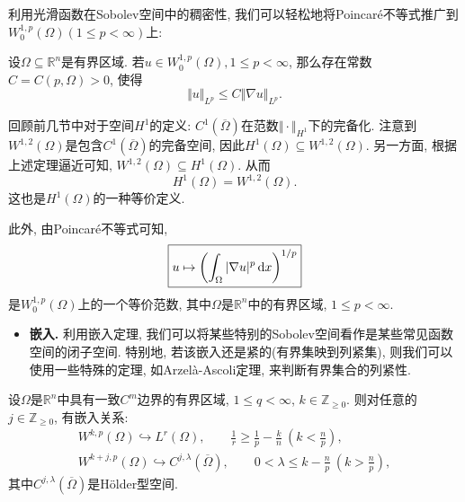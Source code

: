 利用光滑函数在Sobolev空间中的稠密性, 我们可以轻松地将Poincar\'e不等式推广到$W_0^{1, p}(\Omega) (1 \leq p < \infty)$上:

\begin{corollary}[Poincaré不等式]
    设$\Omega \subseteq \mathbb{R}^n$是有界区域. 若$u \in W_0^{1, p}(\Omega), 1 \leq p < \infty$, 那么存在常数$C = C(p, \Omega) > 0$, 使得 
    \begin{equation*}
        \Vert u \Vert_{L^p} \leq C\Vert \nabla u \Vert_{L^p}.
    \end{equation*}
\end{corollary}

回顾前几节中对于空间$H^1$的定义: $C^1(\overline{\Omega})$在范数$\Vert \cdot \Vert_{H^1}$下的完备化.
注意到$W^{1, 2}(\Omega)$是包含$C^1(\overline{\Omega})$的完备空间, 因此$H^1(\Omega) \subseteq W^{1, 2}(\Omega)$.
另一方面, 根据上述定理逼近可知, $W^{1, 2}(\Omega) \subseteq H^1(\Omega)$. 从而
\begin{equation*}
    \boxed{H^1(\Omega) = W^{1, 2}(\Omega).}
\end{equation*} 
这也是$H^1(\Omega)$的一种等价定义.

此外, 由Poincaré不等式可知, 
\begin{equation*}
    \boxed{u \mapsto \left(\int_{\Omega}|\nabla u|^p \,{\rm d}x\right)^{1/p}}
\end{equation*}
是$W_0^{1, p}(\Omega)$上的一个等价范数, 其中$\Omega$是$\mathbb{R}^n$中的有界区域, $1 \leq p < \infty$.

\begin{itemize}
    \item \textbf{嵌入.} 利用嵌入定理, 我们可以将某些特别的Sobolev空间看作是某些常见函数空间的闭子空间.
    特别地, 若该嵌入还是紧的(有界集映到列紧集), 则我们可以使用一些特殊的定理, 如Arzelà-Ascoli定理, 来判断有界集合的列紧性.
\end{itemize}

\begin{theorem}[Sobolev嵌入定理]
    设$\Omega$是$\mathbb{R}^n$中具有一致$C^m$边界的有界区域, $1 \leq q < \infty$, $k \in \mathbb{Z}_{\geq 0}$.
    则对任意的$j \in \mathbb{Z}_{\geq 0}$, 有嵌入关系:
    \begin{gather*}
        W^{k, p}(\Omega) \hookrightarrow L^r(\Omega), \qquad \frac{1}{r} \geq \frac{1}{p} - \frac{k}{n}\ \left(k < \frac{n}{p}\right), \\
        W^{k + j, p}(\Omega) \hookrightarrow C^{j, \lambda}(\overline{\Omega}), \qquad 0 < \lambda \leq k - \frac{n}{p}\ \left(k > \frac{n}{p}\right),
    \end{gather*}
    其中$C^{j, \lambda}(\overline{\Omega})$是H\"older型空间.
\end{theorem}

